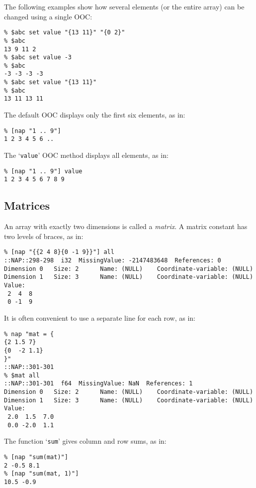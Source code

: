   

The following examples show how several elements (or the entire
  array) can be changed using a single OOC:
  \begin{verbatim}
% $abc set value "{13 11}" "{0 2}"
% $abc
13 9 11 2
% $abc set value -3
% $abc
-3 -3 -3 -3
% $abc set value "{13 11}"
% $abc
13 11 13 11
\end{verbatim}

  

The default OOC displays only the first six elements, as in:
  \begin{verbatim}
% [nap "1 .. 9"]
1 2 3 4 5 6 ..
\end{verbatim}

  

The `\texttt{value}' OOC method displays all elements, as in:
  \begin{verbatim}
% [nap "1 .. 9"] value
1 2 3 4 5 6 7 8 9
\end{verbatim}

\subsection{Matrices}
    \label{array-Matrices}

An array with exactly two dimensions is called a \emph{matrix}.
A matrix constant has two levels of braces, as in:
  \begin{verbatim}
% [nap "{{2 4 8}{0 -1 9}}"] all
::NAP::298-298  i32  MissingValue: -2147483648  References: 0
Dimension 0   Size: 2      Name: (NULL)    Coordinate-variable: (NULL)
Dimension 1   Size: 3      Name: (NULL)    Coordinate-variable: (NULL)
Value:
 2  4  8
 0 -1  9
\end{verbatim}

It is often convenient to use a separate line for each row, as in:
  \begin{verbatim}
% nap "mat = {
{2 1.5 7}
{0  -2 1.1}
}"
::NAP::301-301
% $mat all
::NAP::301-301  f64  MissingValue: NaN  References: 1
Dimension 0   Size: 2      Name: (NULL)    Coordinate-variable: (NULL)
Dimension 1   Size: 3      Name: (NULL)    Coordinate-variable: (NULL)
Value:
 2.0  1.5  7.0
 0.0 -2.0  1.1
\end{verbatim}

  

The function `\texttt{sum}' gives column and row sums, as in:
  \begin{verbatim}
% [nap "sum(mat)"]
2 -0.5 8.1
% [nap "sum(mat, 1)"]
10.5 -0.9
\end{verbatim}

